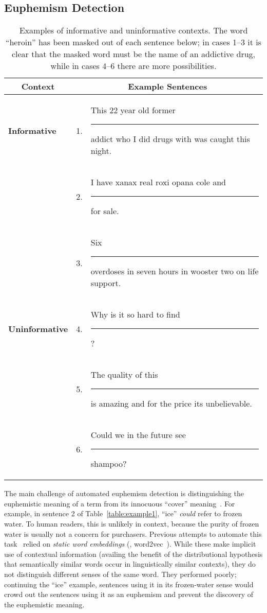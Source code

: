 \subsection{Euphemism Detection}
\begin{table}[ht]
	\centering
	\small
	\caption{Examples of informative and uninformative contexts.  The word ``heroin'' has been masked out of each sentence below; in cases 1--3 it is clear that the masked word must be the name of an addictive drug, while in cases 4--6 there are more possibilities.}
	    \newcommand{\maskedword}{\rule{3em}{1.5ex}}
		\begin{tabular}{ll@{\hspace{\interwordspace}}p{}}
\toprule
		\multicolumn{1}{c}{\textbf{Context}} &  \multicolumn{2}{c}{\textbf{Example Sentences}} \\
		\midrule
		\textbf{Informative}
		& 1. & This 22 year old former \maskedword{} addict who I did drugs with was caught this night. \\
		& 2. & I have xanax real roxi opana cole and \maskedword{} for sale. \\
		& 3. & Six \maskedword{} overdoses in seven hours in wooster two on life support. \\\addlinespace
		\textbf{Uninformative}
		& 4. & Why is it so hard to find \maskedword{}? \\
		& 5. & The quality of this \maskedword{} is amazing and for the price its unbelievable. \\
		& 6. & Could we in the future see \maskedword{} shampoo? \\
		\bottomrule
	\end{tabular}
	\label{table:example3}
\end{table}

The main challenge of automated euphemism detection
is distinguishing the euphemistic meaning of a term
from its innocuous ``cover'' meaning~\cite{yuan2018reading}.
For example, in sentence 2 of Table~\ref{table:example1},
``ice'' \emph{could} refer to frozen water. 
To human readers, this is unlikely in context,
because the purity of frozen water
is usually not a concern for purchasers.
Previous attempts to automate this task~\cite{takuro2020codewords,magu2018determining,yuan2018reading,zhao2016chinese}
relied on \emph{static word embeddings} (\eg, word2vec~\cite{mikolov2013efficient}).
While these make implicit use of contextual information (availing the benefit of the distributional hypothesis that semantically similar words occur in linguistically similar contexts), 
they do not distinguish different senses of the same word.
They performed poorly;
continuing the ``ice'' example,
sentences using it in its frozen-water sense
would crowd out the sentences using it as an euphemism
and prevent the discovery of the euphemistic meaning.

